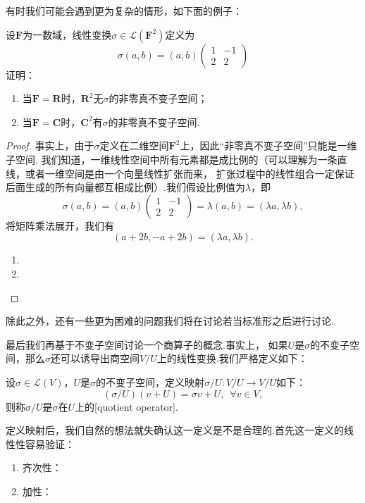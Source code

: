 有时我们可能会遇到更为复杂的情形，如下面的例子：
\begin{example}\label{ex:18:不变子空间}
    设$\mathbf{F}$为一数域，线性变换$\sigma\in\mathcal{L}(\mathbf{F}^2)$定义为
    \[\sigma(a,b)=(a,b)\begin{pmatrix}
        1 & -1 \\ 2 & 2
    \end{pmatrix}\]
    证明：
    \begin{enumerate}[label=(\arabic*)]
        \item 当$\mathbf{F}=\mathbf{R}$时，$\mathbf{R}^2$无$\sigma$的非零真不变子空间；

        \item 当$\mathbf{F}=\mathbf{C}$时，$\mathbf{C}^2$有$\sigma$的非零真不变子空间.
    \end{enumerate}
\end{example}
\begin{proof}
    事实上，由于$\sigma$定义在二维空间$\mathbf{F}^2$上，因此``非零真不变子空间''只能是一维子空间.
    我们知道，一维线性空间中所有元素都是成比例的（可以理解为一条直线，或者一维空间是由一个向量线性扩张而来，
    扩张过程中的线性组合一定保证后面生成的所有向量都互相成比例）.我们假设比例值为$\lambda$，即
    \[\sigma(a,b)=(a,b)\begin{pmatrix}
        1 & -1 \\ 2 & 2
    \end{pmatrix}=\lambda(a,b)=(\lambda a,\lambda b),\]
    将矩阵乘法展开，我们有
    \[(a+2b,-a+2b)=(\lambda a,\lambda b).\]
    \begin{enumerate}[label=(\arabic*)]
        \item 
        \item 
    \end{enumerate}
\end{proof}

除此之外，还有一些更为困难的问题我们将在讨论若当标准形之后进行讨论.

最后我们再基于不变子空间讨论一个商算子的概念.事实上，
如果$U$是$\sigma$的不变子空间，那么$\sigma$还可以诱导出商空间$V/U$上的线性变换.我们严格定义如下：
\begin{definition}
    设$\sigma\in \mathcal{L}(V)$，$U$是$\sigma$的不变子空间，定义映射$\sigma/U:V/U\to V/U$如下：
    \[(\sigma/U)(v+U)=\sigma v+U,\enspace\forall v\in V,\]
    则称$\sigma/U$是$\sigma$在$U$上的[quotient operator].
\end{definition}

定义映射后，我们自然的想法就失确认这一定义是不是合理的.首先这一定义的线性性容易验证：
\begin{enumerate}
    \item 齐次性：
    \item 加性：
\end{enumerate}

